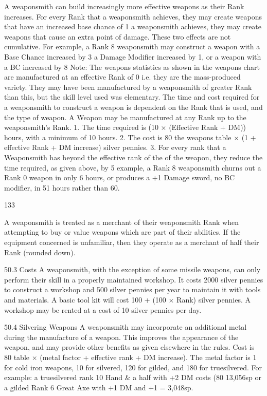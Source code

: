 \documentclass[a4paper]{article}
\begin{document}
\begin{multicols}{3}
A weaponsmith can build increasingly more
effective weapons as their Rank increases.
For every Rank that a weaponsmith achieves, they
may create weapons that have an increased base
chance of 1%
a weaponsmith achieves, they may create weapons
that cause an extra point of damage. These two
effects are not cumulative.
For example, a Rank 8 weaponsmith may construct
a weapon with a Base Chance increased by 3%
a Damage Modifier increased by 1, or a weapon
with a BC increased by 8%
Note: The weapons statistics as shown in the
weapons chart are manufactured at an effective
Rank of 0 i.e. they are the mass-produced variety.
They may have been manufactured by a weaponsmith of greater Rank than this, but the skill level
used was elementary.
The time and cost required for a weaponsmith
to construct a weapon is dependent on the Rank
that is used, and the type of weapon.
A Weapon may be manufactured at any Rank up to
the weaponsmith’s Rank.
1. The time required is (10 × (Effective Rank +
DM)) hours, with a minimum of 10 hours.
2. The cost is 80%
the weapons table × (1 + effective Rank + DM
increase) silver pennies.
3. For every rank that a Weaponsmith has beyond
the effective rank of the of the weapon, they reduce
the time required, as given above, by 5%
example, a Rank 8 weaponsmith churns out a Rank
0 weapon in only 6 hours, or produces a +1 Damage sword, no BC modifier, in 51 hours rather than
60.

133

A weaponsmith is treated as a merchant of their
weaponsmith Rank when attempting to buy or
value weapons which are part of their abilities.
If the equipment concerned is unfamiliar, then they
operate as a merchant of half their Rank (rounded
down).

50.3 Costs
A weaponsmith, with the exception of some
missile weapons, can only perform their skill in
a properly maintained workshop.
It costs 2000 silver pennies to construct a workshop and 500 silver pennies per year to maintain it
with tools and materials. A basic tool kit will cost
100 + (100 × Rank) silver pennies. A workshop
may be rented at a cost of 10 silver pennies per
day.

50.4 Silvering Weapons
A weaponsmith may incorporate an additional
metal during the manufacture of a weapon. This
improves the appearance of the weapon, and may
provide other benefits as given elsewhere in the
rules.
Cost is 80%
table × (metal factor + effective rank + DM increase). The metal factor is 1 for cold iron weapons, 10 for silvered, 120 for gilded, and 180 for
truesilvered.
For example: a truesilvered rank 10 Hand & a half
with +2 DM costs (80%
13,056sp or a gilded Rank 6 Great Axe with +1
DM and +1%
= 3,048sp.


\end{multicols}
\end{document}
